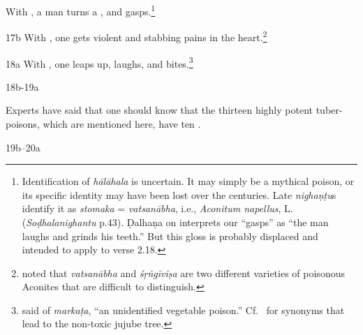 \begin{translation}
    With , a man turns a , and
gasps.\footnote{Identification of \emph{hālāhala} is  uncertain. It may simply
be a mythical poison, or its specific identity may have been lost over the
centuries. Late \emph{nighaṇṭu}s identify it as \emph{stomaka} =
\emph{vatsanābha}, i.e., \emph{Aconitum napellus}, L. 
(\emph{Soḍhalanighantu}
p.43). Ḍalhaṇa on  interprets our “gasps” as “the man laughs
and grinds his teeth.”  But this gloss is probably displaced and intended to apply 
to verse 2.18.}


\item[ 17b] With , one gets violent
 and stabbing pains in the 
heart.\footnote{\citet[407]{gvdb} noted that \emph{vatsanābha} and 
\emph{śṛṅgīviṣa} are two different varieties of poisonous Aconites that are 
difficult to distinguish.}
    
    \item[ 18a]
    With
    , one leaps up, laughs, and 
    bites.\footnote{\citet[299]{gvdb} said of \emph{markaṭa}, “an 
    unidentified vegetable poison.”  Cf.\ \cite[v.36]{suve-2000} for synonyms that 
    lead to the non-toxic jujube tree.}
    
    
    \item[ 18b-19a]
    
    Experts have said that one should know that the thirteen highly potent 
    tuber-poisons, which are mentioned here, have ten .
    
    \item[ 19b--20a]
    

\end{translation}
